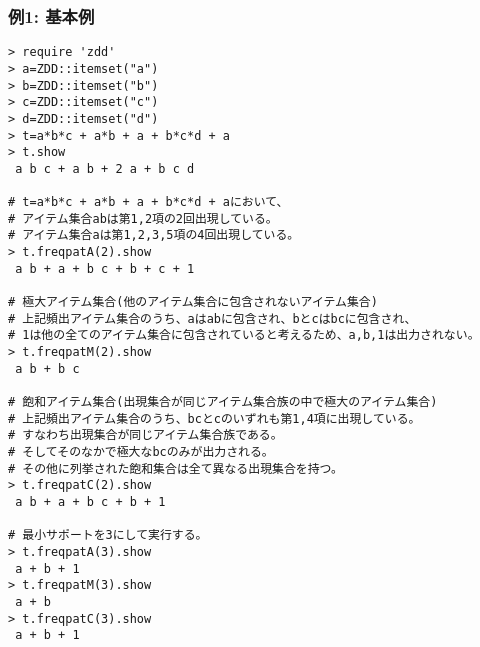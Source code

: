 \subsubsection*{例1: 基本例}



\begin{Verbatim}[baselinestretch=0.7,frame=single]
> require 'zdd'
> a=ZDD::itemset("a")
> b=ZDD::itemset("b")
> c=ZDD::itemset("c")
> d=ZDD::itemset("d")
> t=a*b*c + a*b + a + b*c*d + a
> t.show
 a b c + a b + 2 a + b c d

# t=a*b*c + a*b + a + b*c*d + aにおいて、
# アイテム集合abは第1,2項の2回出現している。
# アイテム集合aは第1,2,3,5項の4回出現している。
> t.freqpatA(2).show
 a b + a + b c + b + c + 1

# 極大アイテム集合(他のアイテム集合に包含されないアイテム集合)
# 上記頻出アイテム集合のうち、aはabに包含され、bとcはbcに包含され、
# 1は他の全てのアイテム集合に包含されていると考えるため、a,b,1は出力されない。
> t.freqpatM(2).show
 a b + b c

# 飽和アイテム集合(出現集合が同じアイテム集合族の中で極大のアイテム集合)
# 上記頻出アイテム集合のうち、bcとcのいずれも第1,4項に出現している。
# すなわち出現集合が同じアイテム集合族である。
# そしてそのなかで極大なbcのみが出力される。
# その他に列挙された飽和集合は全て異なる出現集合を持つ。
> t.freqpatC(2).show
 a b + a + b c + b + 1

# 最小サポートを3にして実行する。
> t.freqpatA(3).show
 a + b + 1
> t.freqpatM(3).show
 a + b
> t.freqpatC(3).show
 a + b + 1
\end{Verbatim}
